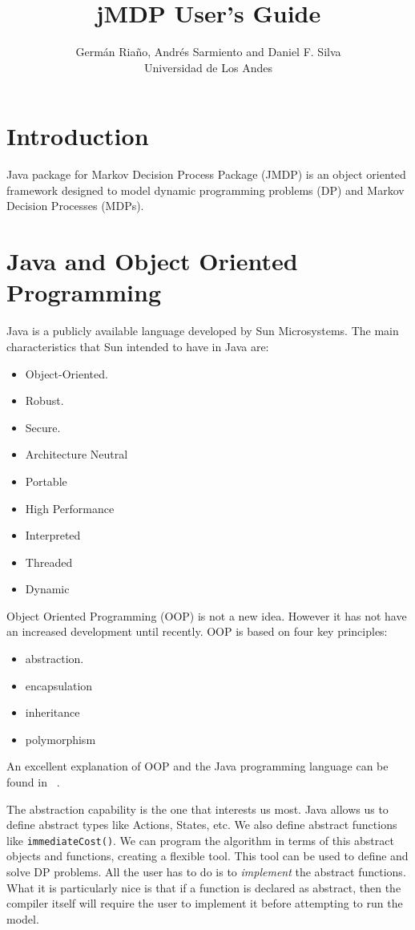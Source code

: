 \documentclass[11pt]{article}
\title{jMDP User's Guide}
\author{  Germ\'an Ria\~no, Andr\'es Sarmiento  and Daniel F. Silva\\
Universidad de Los Andes}
\date{}
\begin{document}

\maketitle
\tableofcontents

\section*{Introduction}

Java package for Markov Decision Process Package (JMDP) is an object oriented framework designed to model dynamic programming problems (DP) and Markov Decision Processes (MDPs).

\section{Java and Object Oriented Programming}


Java is a publicly available language developed by Sun
Microsystems. The main characteristics that Sun intended to have in Java
are:
\begin{itemize}
  \item Object-Oriented.
  \item Robust.
  \item Secure.
  \item Architecture Neutral
  \item Portable
  \item High Performance
  \item Interpreted
  \item Threaded
  \item Dynamic
\end{itemize}

Object Oriented Programming  (OOP) is not a new idea. However it has not
have an increased development until recently. OOP is based on four key
principles:
\begin{itemize}
  \item abstraction.
  \item encapsulation
  \item inheritance
  \item polymorphism
\end{itemize}

An excellent explanation of OOP and the Java programming language can be
found in ~\cite{ld:jj}.

The abstraction capability is the one that interests us most. Java allows us to define abstract types like Actions, States, etc. We also define abstract functions like \lstinline!immediateCost()!.  We can program the algorithm in terms of this abstract objects and functions, creating a flexible tool. This tool can be used to define and solve DP problems. All the user has to do is to \textit{implement} the abstract functions. What it is particularly nice is that if a function is declared as abstract, then the compiler itself will require the user to implement it before attempting to run the
model.
\end{document}
